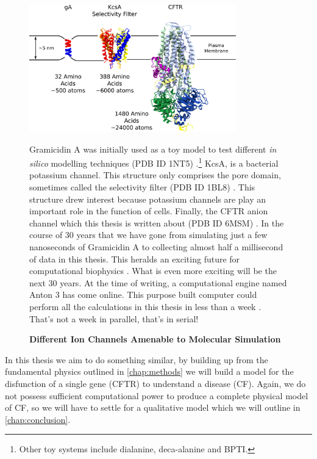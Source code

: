 \begin{figure}
	\begin{center}
		\includegraphics[width=0.8\textwidth]{figures/ion_channel_progression.pdf}
	\end{center}
	\captionsetup{singlelinecheck = false, justification=raggedright}
	\caption[Different Ion Channels Amenable to Molecular Simulation] {\textbf{Different Ion Channels Amenable to Molecular Simulation}}{Gramicidin A was initially used as a toy model to test different \textit{in silico} modelling techniques (PDB ID 1NT5) \cite{sham2003}.\footnote{Other toy systems include dialanine, deca-alanine and BPTI.} KcsA, is a bacterial potassium channel. This structure only comprises the pore domain, sometimes called the selectivity filter (PDB ID 1BL8) \cite{doyle1998}. This structure drew interest because potassium channels are play an important role in the function of cells. Finally, the CFTR anion channel which this thesis is written about (PDB ID 6MSM) \cite{zhang2018a}. In the course of 30 years that we have gone from simulating just a few nanoseconds of Gramicidin A to collecting almost half a millisecond of data in this thesis. This heralds an exciting future for computational biophysics \cite{roux1993}. What is even more exciting will be the next 30 years. At the time of writing, a computational engine named Anton 3 has come online. This purpose built computer could perform all the calculations in this thesis in less than a week \cite{russell2021}. That's not a week in parallel, that's in serial!}
	\label{ion_channel_progress}
\end{figure}

In this thesis we aim to do something similar, by building up from the fundamental physics outlined in \ref{chap:methods} we will build a model for the disfunction of a single gene (CFTR) to understand a disease (CF). Again, we do not possess sufficient computational power to produce a complete physical model of CF, so we will have to settle for a qualitative model which we will outline in \ref{chap:conclusion}. 

